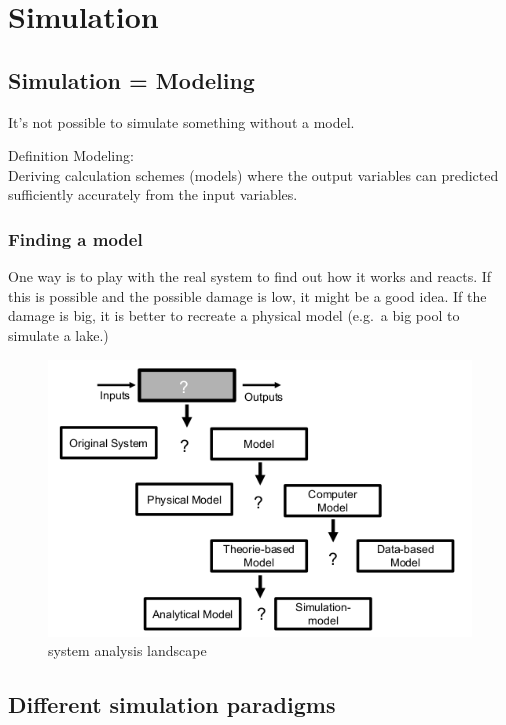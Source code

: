 \hypertarget{simulation}{%
\section{Simulation}\label{simulation}}

\hypertarget{simulation-modeling}{%
\subsection{Simulation = Modeling}\label{simulation-modeling}}

It's not possible to simulate something without a model.

Definition Modeling:\\
Deriving calculation schemes (models) where the output variables can
predicted sufficiently accurately from the input variables.

\hypertarget{finding-a-model}{%
\subsubsection{Finding a model}\label{finding-a-model}}

One way is to play with the real system to find out how it works and
reacts. If this is possible and the possible damage is low, it might be
a good idea. If the damage is big, it is better to recreate a physical
model (e.g.~a big pool to simulate a lake.)

\begin{figure}
\centering
\includegraphics{figures/system_analysis_landscape.png}
\caption{system analysis landscape}
\end{figure}

\hypertarget{different-simulation-paradigms}{%
\subsection{Different simulation
paradigms}\label{different-simulation-paradigms}}

